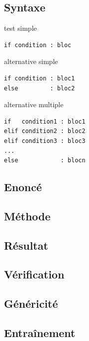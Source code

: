 \subsection{Syntaxe \python}\label{tests:vie-courante:python}
\noindent\begin{minipage}[t]{0.3\textwidth}
test simple\footnotesize
\begin{Verbatim}
if condition : bloc
\end{Verbatim}
\end{minipage}
\hfill
\begin{minipage}[t]{0.3\textwidth}
alternative simple\footnotesize
\begin{Verbatim}
if condition : bloc1
else         : bloc2
\end{Verbatim}
\end{minipage}
\hfill
\begin{minipage}[t]{0.3\textwidth}
alternative multiple\footnotesize
\begin{Verbatim}
if   condition1 : bloc1
elif condition2 : bloc2
elif condition3 : bloc3
...
else            : blocn
\end{Verbatim}
\end{minipage}

\subsection{Enoncé}\label{tests:vie-courante:enonce}

\subsection{Méthode}\label{tests:vie-courante:methode}

\subsection{Résultat}\label{tests:vie-courante:resultat}

\subsection{Vérification}\label{tests:vie-courante:verification}

\subsection{Généricité}\label{tests:vie-courante:genericite}

\subsection{Entraînement}\label{tests:vie-courante:entrainement}

